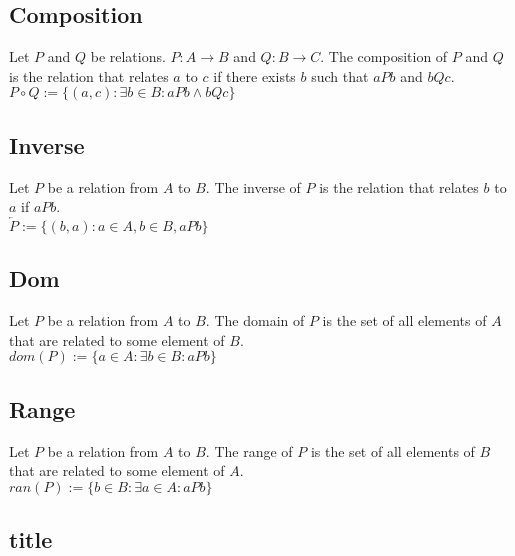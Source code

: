 \documentclass{article}
\begin{document}
\subsection*{Composition}
Let $P$ and $Q$ be relations. $P:A \rightarrow B$ and $Q:B \rightarrow C$. The composition of $P$ and $Q$ is the relation that relates $a$ to $c$ if there exists $b$ such that $aPb$ and $bQc$.\\
$P \circ Q := \{(a,c): \exists b \in B: aPb \land bQc\}$

\subsection*{Inverse}
Let $P$ be a relation from $A$ to $B$. The inverse of $P$ is the relation that relates $b$ to $a$ if $aPb$.\\
$\overleftarrow{P} := \{(b,a): a\in A, b\in B, aPb\}$

\subsection*{Dom}
Let $P$ be a relation from $A$ to $B$. The domain of $P$ is the set of all elements of $A$ that are related to some element of $B$.\\
$dom(P) := \{a \in A: \exists b \in B: aPb\}$

\subsection*{Range}
Let $P$ be a relation from $A$ to $B$. The range of $P$ is the set of all elements of $B$ that are related to some element of $A$.\\
$ran(P) := \{b \in B: \exists a \in A: aPb\}$

\subsection*{title}
\end{document}

